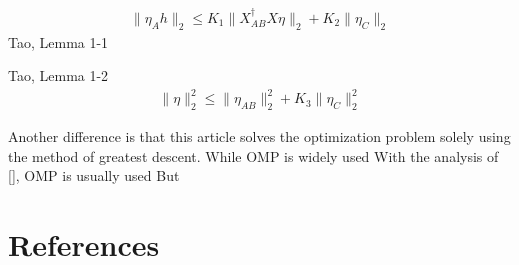 \documentclass[12pt]{article}
\begin{document}
\begin{align*}
\|\eta_Ah\|_2
\leq K_1 \|X^\dagger_{AB} X \eta\|_2 +K_2 \|\eta_C\|_2
\end{align*}
Tao, Lemma 1-1


Tao, Lemma 1-2
\begin{align*}
\|\eta\|_2^2
\leq \|\eta_{AB}\|_2^2 +K_3 \|\eta_C\|_2^2
\end{align*}

Another difference is that this article solves the optimization problem solely using the method of greatest descent.
While OMP is widely used 
With the analysis of [], OMP is usually used
But 




\section{References}
\end{document}
